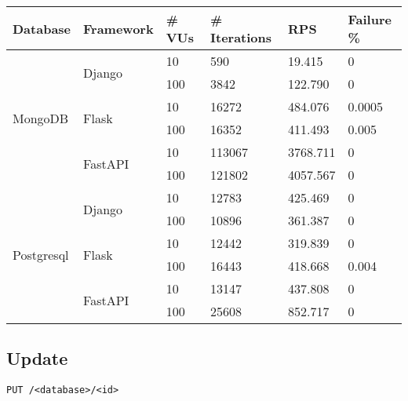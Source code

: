 \documentclass[12pt,onecolumn,a4paper,titlepage]{article}
\begin{document}
{\renewcommand{\arraystretch}{1.5}
\begin{tabular}{| p{1.8cm} | p{2cm} | p{1.3cm} | p{2cm} | p{1.9cm} | p{2cm} |} 
    \hline
    Database & Framework & \# VUs & \# \footnotesize{Iterations} & RPS & \footnotesize{Failure \%} \\
    \hline
    \multirow{6}{*}{MongoDB} & \multirow{2}{*}{Django} & 10 & 590 & 19.415 & 0\\
    & & 100 & 3842 & 122.790 & 0\\
    & \multirow{2}{*}{Flask} & 10 & 16272 & 484.076 & 0.0005\\
    & & 100 & 16352 & 411.493 & 0.005\\
    & \multirow{2}{*}{FastAPI} & 10 & 113067 & 3768.711 & 0\\
    & & 100 & 121802 & 4057.567 & 0\\
    \hline
    \multirow{6}{*}{Postgresql} & \multirow{2}{*}{Django} & 10 & 12783 & 425.469 & 0\\
    & & 100 & 10896 & 361.387 & 0\\
    & \multirow{2}{*}{Flask} & 10 & 12442 & 319.839 & 0\\
    & & 100 & 16443 & 418.668 & 0.004\\
    & \multirow{2}{*}{FastAPI} & 10 & 13147 & 437.808 & 0\\
    & & 100 & 25608 & 852.717 & 0\\
    \hline
\end{tabular}
}

\pagebreak
\subsection{Update}

\begin{lstlisting}[style=mystyle]
    PUT /<database>/<id>
\end{lstlisting}
\end{document}

